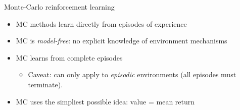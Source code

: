\bgroup
\begin{frame}{Monte-Carlo reinforcement learning}
\begin{itemize}
\item MC methods learn directly from episodes of experience
\item MC is \emph{model-free}: no explicit knowledge of environment mechanisms
\item MC learns from complete episodes
\begin{itemize}
\item Caveat: can only apply to \emph{episodic} environments (all episodes must terminate).
\end{itemize}
\item MC uses the simpliest possible idea: value = mean return
\end{itemize}
\end{frame}
\egroup